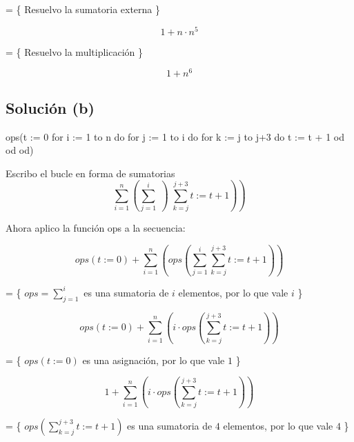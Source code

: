 \documentclass{article}
\begin{document}
= \{ Resuelvo la sumatoria externa \}

\begin{equation*}
  1 + n \cdot n^5
\end{equation*}

= \{ Resuelvo la multiplicación \}

\begin{equation*}
  1 + n^6
\end{equation*}

\subsection{Solución (b)}

\begin{codebox}
\begin{pascallike}
ops(t := 0
for i := 1 to n do
    for j := 1 to i do
    for k := j to j+3 do
        t := t + 1
    od
    od
od)
\end{pascallike}
\end{codebox}

Escribo el bucle en forma de sumatorias
\begin{equation*}
  \sum_{i=1}^{n} \left(  \sum_{j=1}^{i} \left) \sum_{k=j}^{j+3} t := t+1 \right) \right)
\end{equation*}

Ahora aplico la función ops a la secuencia:

\begin{equation*}
  ops(t := 0) + \sum_{i=1}^{n} \left(  ops\left(\sum_{j=1}^{i} \sum_{k=j}^{j+3} t := t+1 \right) \right)
\end{equation*}

= \{ $ops=\sum_{j=1}^{i}$ es una sumatoria de $i$ elementos, por lo que vale $i$ \}

\begin{equation*}
  ops(t := 0) + \sum_{i=1}^{n} \left(  i \cdot ops \left(\sum_{k=j}^{j+3} t := t+1 \right) \right)
\end{equation*}

= \{ $ops(t := 0)$ es una asignación, por lo que vale $1$ \}

\begin{equation*}
  1 + \sum_{i=1}^{n} \left(  i \cdot ops \left(\sum_{k=j}^{j+3} t := t+1 \right) \right)
\end{equation*}

= \{ $ops \left(\sum_{k=j}^{j+3} t := t+1 \right)$ es una sumatoria de $4$ elementos, por lo que vale $4$ \}
\end{document}

